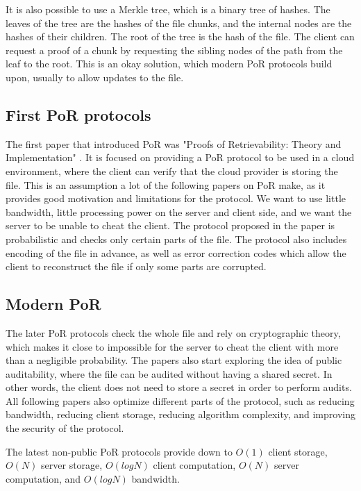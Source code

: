 It is also possible to use a Merkle tree, which is a binary tree of hashes.
The leaves of the tree are the hashes of the file chunks, and the internal nodes are the hashes of their children.
The root of the tree is the hash of the file.
The client can request a proof of a chunk by requesting the sibling nodes of the path from the leaf to the root.
This is an okay solution, which modern PoR protocols build upon, usually to allow updates to the file.

\subsection{First PoR protocols}

The first paper that introduced PoR was "Proofs of Retrievability: Theory and Implementation" \cite{porfirst}.
It is focused on providing a PoR protocol to be used in a cloud environment,
where the client can verify that the cloud provider is storing the file.
This is an assumption a lot of the following papers on PoR make,
as it provides good motivation and limitations for the protocol.
We want to use little bandwidth, little processing power on the server and client side,
and we want the server to be unable to cheat the client.
The protocol proposed in the paper is probabilistic and checks only certain parts of the file.
The protocol also includes encoding of the file in advance, as well as error correction codes
which allow the client to reconstruct the file if only some parts are corrupted.

\subsection{Modern PoR}

The later PoR protocols check the whole file and rely on cryptographic theory,
which makes it close to impossible for the server to cheat the client with more than a negligible probability.
The papers also start exploring the idea of public auditability, where the file can be audited without having
a shared secret.
In other words, the client does not need to store a secret in order to perform audits.
All following papers also optimize different parts of the protocol, such as reducing bandwidth,
reducing client storage, reducing algorithm complexity, and improving the security of the protocol.

The latest non-public PoR protocols provide down to $O(1)$ client storage, $O(N)$ server storage,
$O(log N)$ client computation, $O(N)$ server computation, and $O(log N)$ bandwidth.

